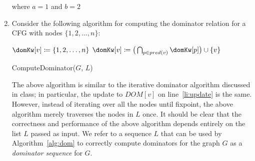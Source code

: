 \documentclass[12pt]{article}
\begin{document}
\begin{enumerate}
\begin{mdframed}
\begin{mdframed}

        where $a = 1$ and $b = 2$
      \end{mdframed}
      \end{mdframed}
      

      \item  Consider the following algorithm for computing the dominator
      relation for a CFG with nodes $\{1,2,\dots,n\}$:

      {\centering
      \begin{minipage}{.9\linewidth}
        \begin{algorithm}[H]
          \DontPrintSemicolon

       
           {
            $\domKw[v] \coloneqq \{1, 2, \dots, n\}$
          }
           {
            $\domKw[v] \coloneqq \big( \bigcap_{p \in pred(v)} \domKw[p] \big) \cup \{v\}$\label{li:update}
          }
          \returnKw{$\domKw$}
        \caption{ComputeDominator($G$, $L$)}
        \label{alg:dom}
        \end{algorithm}
      \end{minipage}
      \par
      }

      The above algorithm is similar to the iterative dominator algorithm
      discussed in class; in particular, the update to $DOM[v]$ on
      line~\ref{li:update} is the same. However, instead of iterating over all
      the nodes until fixpoint, the above algorithm merely traverses the nodes
      in $L$ once. It should be clear that the correctness and performance of
      the above algorithm depends entirely on the list $L$ passed as input. We
      refer to a sequence $L$ that can be used by Algorithm~\ref{alg:dom} to
      correctly compute dominators for the graph $G$ as a \emph{dominator
      sequence} for $G$.

      \begin{figure}[t]
        \centering
        \begin{subfigure}[b]{0.50\linewidth}
          \centering
\end{subfigure}
\end{figure}
\end{enumerate}
\end{document}
